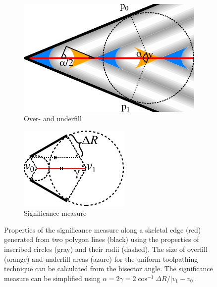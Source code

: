 \begin{figure}
\centering
\setlength{\figheight}{.3\columnwidth}
\begin{subfigure}{0.45\columnwidth} \centering
\includegraphics[height=\figheight]{sources/method/naive_overfill_underfill.pdf}
\caption{Over- and underfill}\label{naive_overfill_underfill}
\end{subfigure}
\begin{subfigure}{0.45\columnwidth} \centering
\includegraphics[height=.8\figheight]{sources/method/significance_properties.pdf}
\caption{Significance measure}\label{distance_based_angles}
\end{subfigure}
\caption{
Properties of the significance measure along a skeletal edge (red) generated from two polygon lines (black) using the properties of inscribed circles (gray) and their radii (dashed).
The size of overfill (orange) and underfill areas (azure) for the uniform toolpathing technique can be calculated from the bisector angle.
The significance measure can be simplified using $\alpha = 2 \gamma = 2 \cos^{-1} \Delta R / |v_1 - v_0|$.
}
\end{figure}


